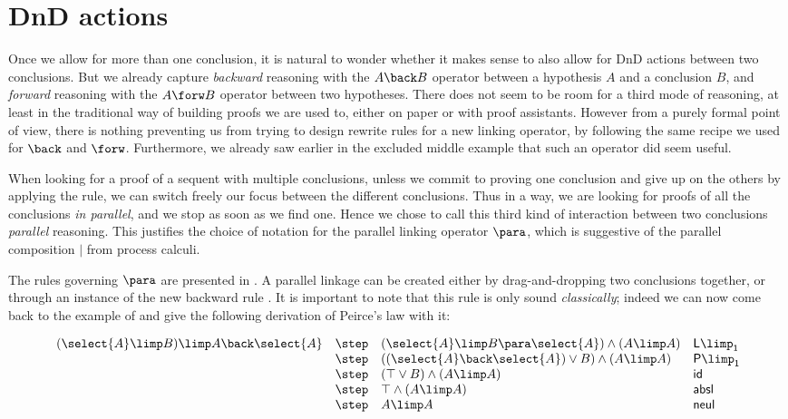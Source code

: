 \section{DnD actions}

Once we allow for more than one conclusion, it is natural to wonder whether it
makes sense to also allow for DnD actions between two conclusions. But we
already capture \emph{backward} reasoning with the $A \back B$ operator between
a hypothesis $A$ and a conclusion $B$, and \emph{forward} reasoning with the $A
\forw B$ operator between two hypotheses. There does not seem to be room for a
third mode of reasoning, at least in the traditional way of building proofs we
are used to, either on paper or with proof assistants. However from a purely
formal point of view, there is nothing preventing us from trying to design
rewrite rules for a new linking operator, by following the same recipe we used
for $\back$ and $\forw$. Furthermore, we already saw earlier in the excluded
middle example that such an operator did seem useful.

When looking for a proof of a sequent with multiple conclusions, unless we
commit to proving one conclusion and give up on the others by applying the
{} rule, we can switch freely our focus between the different
conclusions. Thus in a way, we are looking for proofs of all the conclusions
\emph{in parallel}, and we stop as soon as we find one. Hence we chose to
call this third kind of interaction between two conclusions \emph{parallel}
reasoning. This justifies the choice of notation for the parallel linking
operator $\para$, which is suggestive of the parallel composition $\mid$ from
process calculi.

The rules governing $\para$ are presented in . A parallel
linkage can be created either by drag-and-dropping two conclusions together, or
through an instance of the new backward rule {}. It is
important to note that this rule is only sound \emph{classically}; indeed we can
now come back to the example of  and give the following
derivation of Peirce's law with it:

$$
\begin{array}{llll}
  (\select{A} \limp B) \limp A \back \select{A}
  &\step& (\select{A} \limp B \para \select{A}) \land (A \limp A) &\mathsf{L{\limp}_1} \\
  &\step& ((\select{A} \back \select{A}) \lor B) \land (A \limp A) &\mathsf{P{\limp}_1} \\
  &\step& (\top \lor B) \land (A \limp A) &\mathsf{id} \\
  &\step& \top \land (A \limp A) &\mathsf{absl} \\
  &\step& A \limp A &\mathsf{neul}
\end{array}
$$

